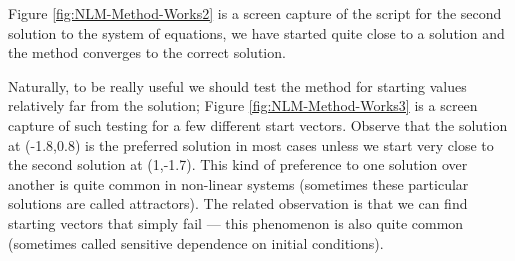 Figure \ref{fig:NLM-Method-Works2} is a screen capture of the script for the second solution to the system of equations, we have started quite close to a solution and the method converges to the correct solution.  

Naturally, to be really useful we should test the method for starting values relatively far from the solution; Figure \ref{fig:NLM-Method-Works3} is a screen capture of such testing for a few different start vectors. 
Observe that the solution at (-1.8,0.8) is the preferred solution in most cases unless we start very close to the second solution at (1,-1.7).  
This kind of preference to one solution over another is quite common in non-linear systems (sometimes these particular solutions are called attractors).
The related observation is that we can find starting vectors that simply fail --- this phenomenon is also quite common (sometimes called sensitive dependence on initial conditions).

